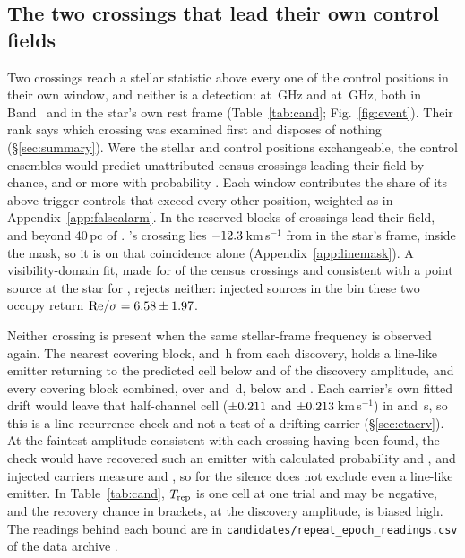\subsection{The two crossings that lead their own control fields}
\label{sec:vistest}

Two crossings reach a stellar statistic above every one of the \NCtrl{}
control positions in their own window, and neither is a detection: \EvAStar{}
at \RqFreqSx\,GHz and \EvBStar{} at \RqFreqCp\,GHz, both in Band~\EvABand{}
and in the star's own rest frame (Table~\ref{tab:cand};
Fig.~\ref{fig:event}). Their rank says which crossing was examined first and
disposes of nothing (\S\ref{sec:summary}). Were the stellar and control
positions exchangeable, the control ensembles would predict \RkCondExp{} unattributed census crossings leading their field
by chance, and \RkCondNObsWord{} or more with probability \RkCondProb. Each
window contributes the share of its above-trigger controls that exceed every
other position, weighted as in Appendix~\ref{app:falsealarm}. In the reserved
blocks \RkHoLead{} of \RkHoN{} crossings lead their field, and beyond 40\,pc
\RkOosLead{} of \RkOosN.
\EvBStar's crossing lies $-12.3$\,km\,s$^{-1}$ from \EvBLine{} in the star's
frame, inside the mask, so it is \EvBDispo{} on that coincidence alone
(Appendix~\ref{app:linemask}). A visibility-domain fit, made for
\CsNVisFit{} of the \CsNCross{} census crossings and consistent with a point
source at the star for \CsNVisLocal, rejects neither: injected sources in the
bin these two occupy return ${\rm Re}/\sigma=6.58\pm
1.97$.

Neither crossing is present when the same stellar-frame frequency is observed
again. The nearest covering block, \RcSxNearH{} and \EvBDeepH\,h from each
discovery, holds a line-like emitter returning to the predicted cell below
\RqNearFracSx{} and \RqNearFracCp{} of the discovery amplitude, and every
covering block combined, over \RqSpanDSx{} and \RqSpanDCp\,d, below
\RcSxFive{} and \RcCpFive. Each carrier's own fitted drift would leave that
half-channel cell ($\pm0.211$ and $\pm0.213$\,km\,s$^{-1}$) in
\ZtSxLeaveSec{} and \ZtCpLeaveSec\,s, so this is a line-recurrence check and
not a test of a drifting carrier (\S\ref{sec:etacrv}). At the faintest
amplitude consistent with each crossing having been found, the check would
have recovered such an emitter with calculated probability \RqPowerTrigSx{}
and \RqPowerTrigCp, and injected carriers measure \HjMeasSx{} and \HjMeasCp,
so for \EvBStar{} the silence does not exclude even a line-like emitter. In
Table~\ref{tab:cand}, $T_{\rm rep}$ is one cell at one trial and may be
negative, and the recovery chance in brackets, at the discovery amplitude, is
biased high. The
readings behind each bound are in
\texttt{candidates/repeat\_epoch\_readings.csv} of the data archive
\citep{SIdeposit}.


